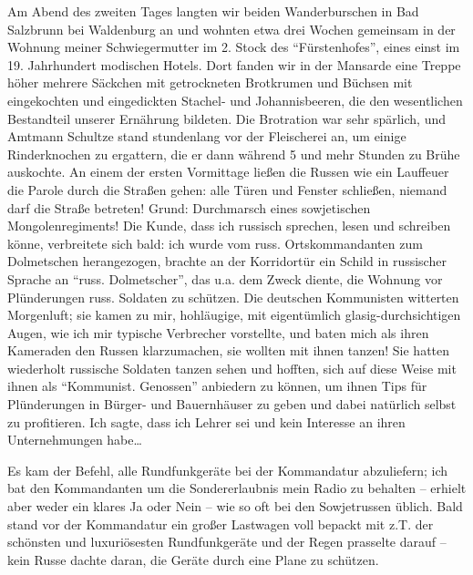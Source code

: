  Am Abend des zweiten Tages langten wir beiden Wanderburschen in Bad Salzbrunn bei Waldenburg an und wohnten etwa drei Wochen gemeinsam in der Wohnung meiner Schwiegermutter im 2. Stock des \enquote{Fürstenhofes}, eines einst im 19. Jahrhundert modischen Hotels. Dort fanden wir in der Mansarde eine Treppe höher mehrere Säckchen mit getrockneten Brotkrumen und Büchsen mit eingekochten und eingedickten Stachel- und Johannisbeeren, die den wesentlichen Bestandteil unserer Ernährung bildeten. Die Brotration war sehr spärlich, und Amtmann Schultze stand stundenlang vor der Fleischerei an, um einige Rinderknochen zu ergattern, die er dann während 5 und mehr Stunden zu Brühe auskochte. An einem der ersten Vormittage ließen die Russen wie ein Lauffeuer die Parole durch die Straßen gehen: alle Türen und Fenster schließen, niemand darf die Straße betreten! Grund: Durchmarsch eines sowjetischen Mongolenregiments! Die Kunde, dass ich russisch sprechen, lesen und schreiben könne, verbreitete sich bald: ich wurde vom russ. Ortskommandanten zum Dolmetschen herangezogen, brachte an der Korridortür ein Schild in russischer Sprache an \enquote{russ. Dolmetscher}, das u.a. dem  Zweck diente, die Wohnung vor Plünderungen russ. Soldaten zu schützen. Die deutschen Kommunisten witterten Morgenluft; sie kamen zu mir, hohläugige, mit eigentümlich glasig-durchsichtigen Augen, wie ich mir typische Verbrecher vorstellte, und baten mich als ihren Kameraden den Russen klarzumachen, sie wollten mit ihnen tanzen! Sie hatten wiederholt russische Soldaten tanzen sehen und hofften, sich auf diese Weise mit ihnen als \enquote{Kommunist. Genossen} anbiedern zu können, um ihnen Tips für Plünderungen in Bürger- und Bauernhäuser zu geben und dabei natürlich selbst zu profitieren. Ich sagte, dass ich Lehrer sei und kein Interesse an ihren Unternehmungen habe\dots

Es kam der Befehl, alle Rundfunkgeräte bei der Kommandatur abzuliefern; ich bat den Kommandanten um die Sondererlaubnis mein Radio zu behalten -- erhielt aber weder ein klares Ja oder Nein -- wie so oft bei den Sowjetrussen üblich. Bald stand vor der Kommandatur ein großer Lastwagen voll bepackt mit z.T. der schönsten und luxuriösesten Rundfunkgeräte und der Regen prasselte darauf -- kein Russe dachte daran, die Geräte durch eine Plane zu schützen.

